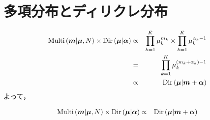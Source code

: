 \documentclass[a4j]{jarticle}
\begin{document}
\section{多項分布とディリクレ分布}
\begin{eqnarray}
\operatorname{\rm Multi}{( \boldsymbol{m} | \boldsymbol{\mu}, N )} \times \operatorname{\rm Dir}{(\boldsymbol{\mu} | \boldsymbol{\alpha})}
&\propto& \prod_{k=1}^{K}{\mu_k^{m_k}} \times \prod_{k=1}^{K}{\mu_k^{\alpha_k - 1}}\\
&=& \prod_{k=1}^{K}{\mu_k^{(m_k + \alpha_k)-1}}\\
&\propto& \operatorname{\rm Dir}{(\boldsymbol{\mu} | \boldsymbol{
m} + \boldsymbol{\alpha})}
\end{eqnarray}
よって，
\begin{screen}
\begin{eqnarray}
\operatorname{\rm Multi}{( \boldsymbol{m} | \boldsymbol{\mu}, N )} \times \operatorname{\rm Dir}{(\boldsymbol{\mu} | \boldsymbol{\alpha})} &\propto& \operatorname{\rm Dir}{(\boldsymbol{\mu} | \boldsymbol{
m} + \boldsymbol{\alpha})}
\end{eqnarray}
\end{screen}
\end{document}

